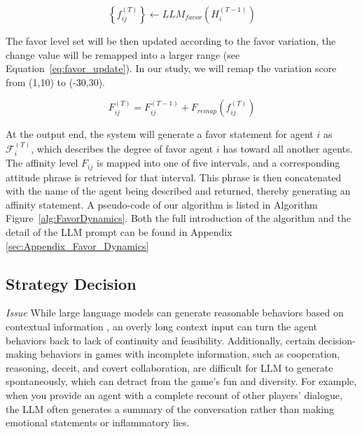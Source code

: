 \documentclass[11pt]{article}
\begin{document}
\begin{equation}
  \left\{ f_{ij}^{(T)} \right\} \leftarrow LLM_{favor}( H_i^{(T-1)} ) 
  \label{eq:favor_LLM}
\end{equation}

The favor level set will be then updated according to the favor variation, the change value will be remapped into a larger range (see Equation~\ref{eq:favor_update}). In our study, we will remap the variation score from (1,10) to (-30,30).

\begin{equation}
  F_{ij}^{(T)} = F_{ij}^{(T-1)} + F_{remap}(f_{ij}^{(T)})
  \label{eq:favor_update}
\end{equation}

At the output end, the system will generate a favor statement for agent $ i $ as $ \mathcal{F}_i^{(T)} $, which describes the degree of favor agent $ i $ has toward all another agents. The affinity level $ F_{ij} $ is mapped into one of five intervals, and a corresponding attitude phrase is retrieved for that interval. This phrase is then concatenated with the name of the agent being described and returned, thereby generating an affinity statement. A pseudo-code of our algorithm is listed in Algorithm Figure~\ref{alg:FavorDynamics}. Both the full introduction of the algorithm and the detail of the LLM prompt can be found in Appendix \ref{sec:Appendix_Favor_Dynamics}


\subsection{Strategy Decision} \label{sec:StrategyDecision}

\textit{Issue} While large language models can generate reasonable behaviors based on contextual information \citep{dillion2023can,horton2023large,park2022social}, an overly long context input can turn the agent behaviors back to lack of continuity and feasibility. Additionally, certain decision-making behaviors in games with incomplete information, such as cooperation, reasoning, deceit, and covert collaboration, are difficult for LLM to generate spontaneously, which can detract from the game's fun and diversity. For example, when you provide an agent with a complete recount of other players' dialogue, the LLM often generates a summary of the conversation rather than making emotional statements or inflammatory lies.
\end{document}
